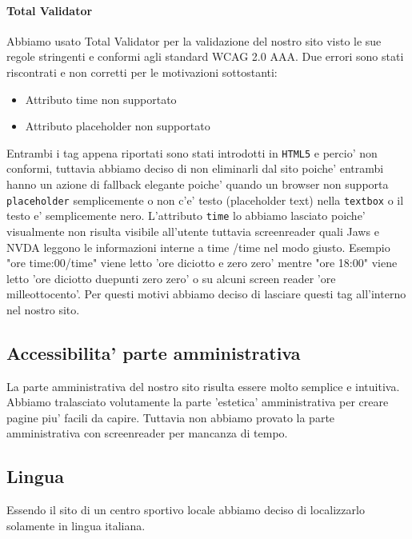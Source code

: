 \paragraph{Total Validator}
Abbiamo usato Total Validator per la validazione del nostro sito visto le sue regole stringenti e conformi agli standard WCAG 2.0 AAA. Due errori sono stati riscontrati e non corretti per le motivazioni sottostanti:
\begin{itemize}
	\item Attributo \<time\> non supportato
	\item Attributo \<placeholder\> non supportato
\end{itemize}
Entrambi i tag appena riportati sono stati introdotti in \texttt{HTML5} e percio' non conformi, tuttavia abbiamo deciso di non eliminarli dal sito poiche' entrambi hanno un azione di fallback elegante poiche' quando un browser non supporta \texttt{placeholder} semplicemente o non c'e' testo (placeholder text) nella \texttt{textbox} o il testo e' semplicemente nero.
L'attributo \texttt{time} lo abbiamo lasciato poiche' visualmente non risulta visibile all'utente tuttavia screenreader quali Jaws e NVDA leggono le informazioni interne a \<time\> \</time\> nel modo giusto. 
Esempio "ore \<time:00\</time\>" viene letto 'ore diciotto e zero zero' mentre "ore 18:00" viene letto 'ore diciotto duepunti zero zero' o su alcuni screen reader 'ore milleottocento'.
Per questi motivi abbiamo deciso di lasciare questi tag all'interno nel nostro sito.

\subsection{Accessibilita' parte amministrativa}
La parte amministrativa del nostro sito risulta essere molto semplice e intuitiva.
Abbiamo tralasciato volutamente la parte 'estetica' amministrativa per creare pagine piu' facili da capire.\newline
Tuttavia non abbiamo provato la parte amministrativa con screenreader per mancanza di tempo.
\subsection{Lingua}
Essendo il sito di un centro sportivo locale abbiamo deciso di localizzarlo solamente in lingua italiana.
